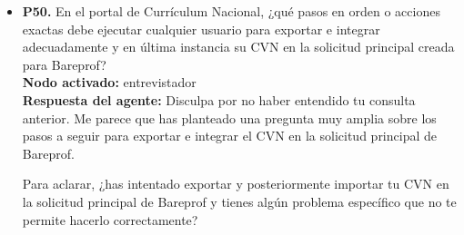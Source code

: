 \documentclass{article}
\begin{document}
\begin{itemize}
      \item \textbf{P50.} En el portal de Currículum Nacional, ¿qué pasos en orden o acciones exactas debe ejecutar cualquier usuario para exportar e integrar adecuadamente y en última instancia su CVN en la solicitud principal creada para Bareprof? \\
            \textbf{Nodo activado:} entrevistador \\
            \textbf{Respuesta del agente:} Disculpa por no haber entendido tu consulta anterior. Me parece que has planteado una pregunta muy amplia sobre los pasos a seguir para exportar e integrar el CVN en la solicitud principal de Bareprof.

            Para aclarar, ¿has intentado exportar y posteriormente importar tu CVN en la solicitud principal de Bareprof y tienes algún problema específico que no te permite hacerlo correctamente?

\end{itemize}
\end{document}

